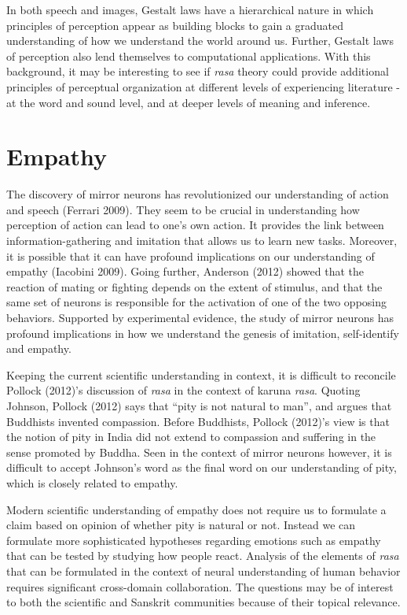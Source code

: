 In both speech and images, Gestalt laws have a hierarchical nature in which principles of perception appear as building blocks to gain a graduated understanding of how we understand the world around us. Further, Gestalt laws of perception also lend themselves to computational applications. With this background, it may be interesting to see if \textsl{rasa} theory could provide additional principles of perceptual organization at different levels of experiencing literature - at the word and sound level, and at deeper levels of meaning and inference.

\section*{Empathy}

The discovery of mirror neurons has revolutionized our understanding of action and speech (Ferrari 2009). They seem to be crucial in understanding how perception of action can lead to one’s own action. It provides the link between information-gathering and imitation that allows us to learn new tasks. Moreover, it is possible that it can have profound implications on our understanding of empathy (Iacobini 2009). Going further, Anderson (2012) showed that the reaction of mating or fighting depends on the extent of stimulus, and that the same set of neurons is responsible for the activation of one of the two opposing behaviors. Supported by experimental evidence, the study of mirror neurons has profound implications in how we understand the genesis of imitation, self-identify and empathy. 

Keeping the current scientific understanding in context, it is difficult to reconcile Pollock (2012)’s discussion of \textsl{rasa} in the context of karuna \textsl{rasa}. Quoting Johnson, Pollock (2012) says that “pity is not natural to man”, and argues that Buddhists invented compassion. Before Buddhists, Pollock (2012)’s view is that the notion of pity in India did not extend to compassion and suffering in the sense promoted by Buddha. Seen in the context of mirror neurons however, it is difficult to accept Johnson’s word as the final word on our understanding of pity, which is closely related to empathy. 

Modern scientific understanding of empathy does not require us to formulate a claim based on opinion of whether pity is natural or not. Instead we can formulate more sophisticated hypotheses regarding emotions such as empathy that can be tested by studying how people react. Analysis of the elements of \textsl{rasa} that can be formulated in the context of neural understanding of human behavior requires significant cross-domain collaboration. The questions may be of interest to both the scientific and Sanskrit communities because of their topical relevance. 

